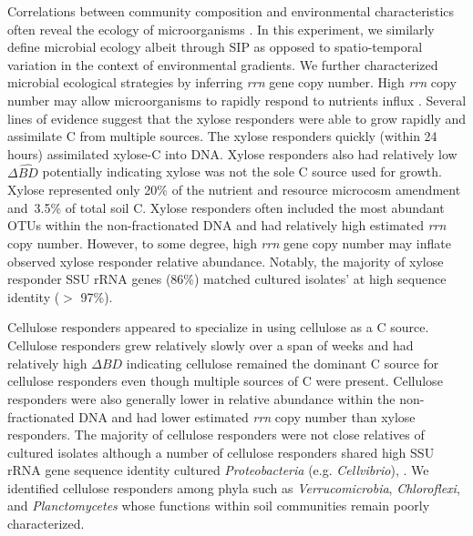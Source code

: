 Correlations between community composition and environmental characteristics
often reveal the ecology of microorganisms \citep{Fierer2007}. In this
experiment, we similarly define microbial ecology albeit through SIP as opposed
to spatio-temporal variation in the context of environmental gradients. We
further characterized microbial ecological strategies by inferring \textit{rrn}
gene copy number. High \textit{rrn} copy number may allow microorganisms to
rapidly respond to nutrients influx \citep{Klappenbach_2000}. Several lines of
evidence suggest that the xylose responders were able to grow rapidly and
assimilate C from multiple sources. The xylose responders quickly (within 24
hours) assimilated xylose-C into DNA. Xylose responders also had relatively low
$\Delta\hat{BD}$ potentially indicating xylose was not the sole C source
used for growth. Xylose represented only 20\% of the nutrient and resource
microcosm amendment and~3.5\% of total soil C. Xylose responders often included
the most abundant OTUs within the non-fractionated DNA and had relatively high
estimated \textit{rrn} copy number. However, to some degree, high \textit{rrn}
gene copy number may inflate observed xylose responder relative abundance.
Notably, the majority of xylose responder SSU rRNA genes (86\%) matched
cultured isolates' at high sequence identity ($>$ 97\%). 

Cellulose responders appeared to specialize in using cellulose as
a C source. Cellulose responders grew relatively slowly over a span of weeks
and had relatively high $\Delta\hat{BD}$ indicating cellulose remained the
dominant C source for cellulose responders even though multiple sources of
C were present. Cellulose responders were also generally lower in relative
abundance within the non-fractionated DNA and had lower estimated \textit{rrn}
copy number than xylose responders. The majority of cellulose responders were
not close relatives of cultured isolates although a number of cellulose
responders shared high SSU rRNA gene sequence identity cultured 
\textit{Proteobacteria} (e.g. \textit{Cellvibrio}), . We identified
cellulose responders among phyla such as \textit{Verrucomicrobia},
\textit{Chloroflexi}, and \textit{Planctomycetes} whose functions within soil
communities remain poorly characterized.

